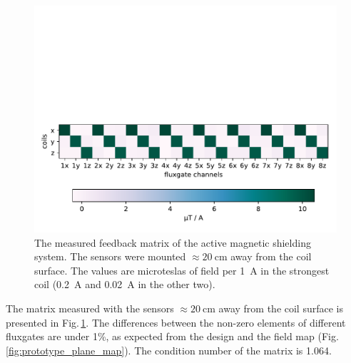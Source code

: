 \begin{figure}
  \centering
  \includegraphics[width=.9\linewidth]{gfx/prototype/SFC_matrix_green.pdf}
  \caption{The measured feedback matrix of the active magnetic shielding system. The sensors were mounted $\approx\SI{20}{\centi\meter}$ away from the coil surface. The values are microteslas of field per \SI{1}{\ampere} in the strongest coil (\SI{0.2}{\ampere} and \SI{0.02}{\ampere} in the other two).}\label{fig:prototype_feedback_matrix}
\end{figure}

The matrix measured with the sensors $\approx\SI{20}{\centi\meter}$ away from the coil surface is presented in Fig.\,\ref{fig:prototype_feedback_matrix}.
The differences between the non-zero elements of different fluxgates are under 1\%, as expected from the design and the field map (Fig.\,\ref{fig:prototype_plane_map}).
The condition number of the matrix is \num{1.064}.




